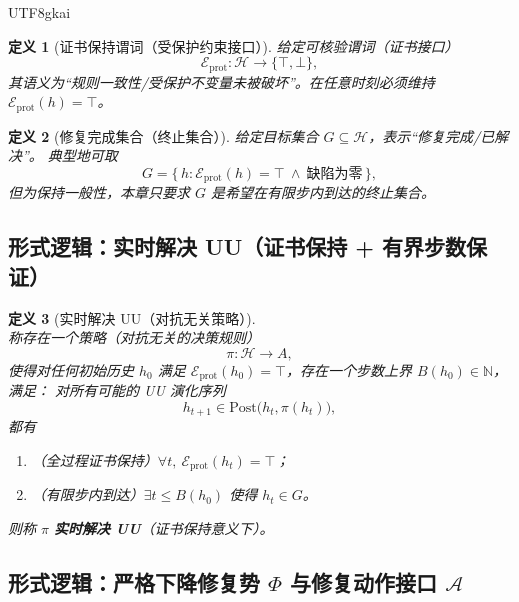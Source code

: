\documentclass[12pt]{article}
\newtheorem{definition}{定义}[section]
\newcommand{\NN}{\mathbb{N}}
\begin{document}
\begin{CJK*}{UTF8}{gkai}
\begin{definition}[证书保持谓词（受保护约束接口）]
\label{def:uu-prot-certificate}
给定可核验谓词（证书接口）
\[
  \mathcal{E}_{\mathrm{prot}}:\mathcal{H}\to\{\top,\bot\},
\]
其语义为“规则一致性/受保护不变量未被破坏”。在任意时刻必须维持 $\mathcal{E}_{\mathrm{prot}}(h)=\top$。
\end{definition}

\begin{definition}[修复完成集合（终止集合）]
\label{def:uu-goal-set}
给定目标集合 $G\subseteq\mathcal{H}$，表示“修复完成/已解决”。
典型地可取
\[
  G=\{\,h:\mathcal{E}_{\mathrm{prot}}(h)=\top\ \wedge\ \text{缺陷为零}\,\},
\]
但为保持一般性，本章只要求 $G$ 是希望在有限步内到达的终止集合。
\end{definition}

\subsection{形式逻辑：实时解决 UU（证书保持 + 有界步数保证）}
\label{sec:uu-realtime-iff-realtime}

\begin{definition}[实时解决 UU（对抗无关策略）]
\label{def:uu-realtime-solve}
称存在一个策略（对抗无关的决策规则）
\[
  \pi:\mathcal{H}\to A,
\]
使得对任何初始历史 $h_0$ 满足 $\mathcal{E}_{\mathrm{prot}}(h_0)=\top$，存在一个步数上界 $B(h_0)\in\NN$，满足：
对所有可能的 UU 演化序列
\[
  h_{t+1}\in \mathrm{Post}\bigl(h_t,\pi(h_t)\bigr),
\]
都有
\begin{enumerate}
  \item （全过程证书保持）$\forall t,\ \mathcal{E}_{\mathrm{prot}}(h_t)=\top$；
  \item （有限步内到达）$\exists t\le B(h_0)$ 使得 $h_t\in G$。
\end{enumerate}
则称 $\pi$ \textbf{实时解决 UU}（证书保持意义下）。
\end{definition}

\subsection{形式逻辑：严格下降修复势 $\Phi$ 与修复动作接口 $\mathcal{A}$}
\label{sec:uu-realtime-iff-defect-structure}


\end{CJK*}
\end{document}

